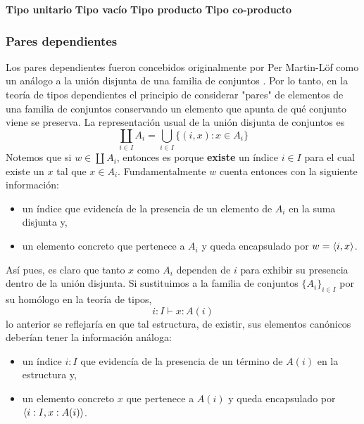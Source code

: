 \documentclass{article}
\begin{document}
    
    
    \hfill\newline\textbf{Tipo unitario}\hfill\newline
    \hfill\newline\textbf{Tipo vacío}\hfill\newline
    \hfill\newline\textbf{Tipo producto}\hfill\newline
    \hfill\newline\textbf{Tipo co-producto}\hfill\newline

    \subsubsection{Pares dependientes}
    Los pares dependientes fueron concebidos originalmente por Per 
    Martin-L\"{o}f como un an\'{a}logo a la uni\'{o}n disjunta de una familia de 
    conjuntos \cite{PerMartin-Lof98}. Por lo tanto, en la teoría de tipos 
    dependientes el principio de considerar "pares" de elementos de una familia 
    de conjuntos conservando un elemento que apunta de qu\'{e} conjunto viene se 
    preserva. La representaci\'{o}n usual de la uni\'{o}n disjunta de conjuntos 
    es
    $$
        \coprod\limits_{i\in I} A_i = \bigcup\limits_{i\in I} \{(i, x) : x \in A_i\}
    $$
    Notemos que si $w \in \coprod A_i$, entonces es porque \textbf{existe}
    un \'{i}ndice $i \in I$ para el cual existe un $x$ tal que $x \in A_i$.
    Fundamentalmente $w$ cuenta entonces con la siguiente información:
    \begin{itemize}
        \item un \'{i}ndice que evidenc\'{i}a de la presencia de un elemento de 
        $A_i$ en la suma disjunta y,
        \item un elemento concreto que pertenece a $A_i$ y queda encapsulado por 
        $w = \langle i, x \rangle$.
    \end{itemize}
    As\'{i} pues, es claro que tanto $x$ como $A_i$ dependen de $i$ para 
    exhibir su presencia dentro de la uni\'{o}n disjunta.
    Si sustituimos a la familia de conjuntos $\{A_i\}_{i\in I}$ por su 
    hom\'{o}logo en la teoría de tipos, 
    $$
        i : I \vdash x : A(i)
    $$
    lo anterior se reflejar\'{i}a en que tal estructura, de existir, sus 
    elementos can\'{o}nicos deberían tener la información an\'{a}loga:
    \begin{itemize}
        \item un \'{i}ndice $i : I$ que evidenc\'{i}a de la presencia de un 
        t\'{e}rmino de $A(i)$ en la estructura y,
        \item un elemento concreto $x$ que pertenece a $A(i)$ y queda 
        encapsulado por $\langle i : I, x : A(i) \rangle$.
    \end{itemize}
\end{document}
